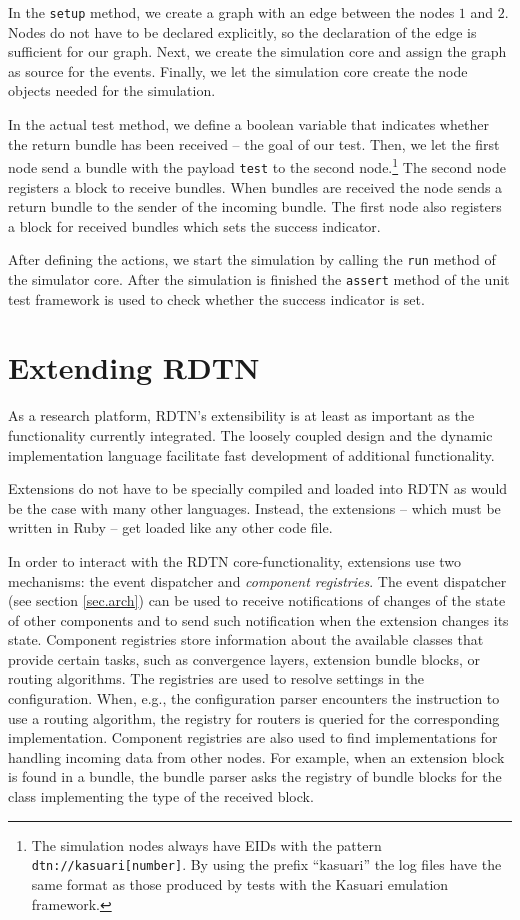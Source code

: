 \documentclass[a4paper]{article}
\begin{document}
In the {\tt setup} method, we create a graph with an edge between the nodes $1$
and $2$. Nodes do not have to be declared explicitly, so the declaration of the
edge is sufficient for our graph. Next, we create the simulation core and assign
the graph as source for the events. Finally, we let the simulation core create
the node objects needed for the simulation.

In the actual test method, we define a boolean variable that indicates whether
the return bundle has been received -- the goal of our test. Then, we let the
first node send a bundle with the payload {\tt test} to the second
node.\footnote{The simulation nodes always have EIDs with the pattern {\tt
dtn://kasuari[number]}. By using the prefix ``kasuari'' the log files have the
same format as those produced by tests with the Kasuari emulation framework.}
The second node registers a block to receive bundles. When bundles are received
the node sends a return bundle to the sender of the incoming bundle.
The first node also registers a block for received bundles which sets the
success indicator.

After defining the actions, we start the simulation by calling the {\tt run}
method of the simulator core. After the simulation is finished the {\tt assert}
method of the unit test framework is used to check whether the success indicator
is set.

\section{Extending RDTN}\label{sec.extending}

As a research platform, RDTN's extensibility is at least as important as the
functionality currently integrated. The loosely coupled design and the dynamic
implementation language facilitate fast development of additional functionality.

Extensions do not have to be specially compiled and loaded into RDTN as would be
the case with many other languages. Instead, the extensions -- which must be
written in Ruby -- get loaded like any other code file.

In order to interact with the RDTN core-functionality, extensions use two
mechanisms: the event dispatcher and {\em component registries}. The event dispatcher
(see section \ref{sec.arch}) can be used to receive notifications of changes of
the state of other components and to send such notification when the extension
changes its state. Component registries store information about the available
classes that provide certain tasks, such as convergence layers, extension bundle
blocks, or routing algorithms. The registries are used to resolve settings
in the configuration. When, e.g., the configuration parser encounters the
instruction to use a routing algorithm, the registry for routers is queried for
the corresponding implementation. Component registries are also used to find
implementations for handling incoming data from other nodes. For example, when
an extension block is found in a bundle, the bundle parser asks the registry of
bundle blocks for the class implementing the type of the received block.
\end{document}
